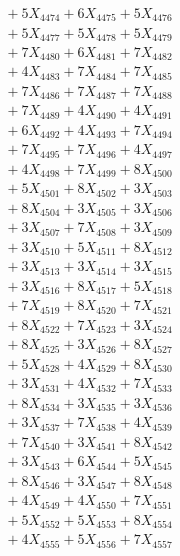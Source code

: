\documentclass[a4paper,10pt]{article}
\begin{document}
{\begin{align}
&\;  + 5 X_{4474} + 6 X_{4475} + 5 X_{4476} \\[0.3ex]
&\;  + 5 X_{4477} + 5 X_{4478} + 5 X_{4479} \\[0.5ex]\allowbreak
&\;  + 7 X_{4480} + 6 X_{4481} + 7 X_{4482} \\[0.3ex]
&\;  + 4 X_{4483} + 7 X_{4484} + 7 X_{4485} \\[0.3ex]
&\;  + 7 X_{4486} + 7 X_{4487} + 7 X_{4488} \\[0.3ex]
&\;  + 7 X_{4489} + 4 X_{4490} + 4 X_{4491} \\[0.3ex]
&\;  + 6 X_{4492} + 4 X_{4493} + 7 X_{4494} \\[0.3ex]
&\;  + 7 X_{4495} + 7 X_{4496} + 4 X_{4497} \\[0.3ex]
&\;  + 4 X_{4498} + 7 X_{4499} + 8 X_{4500} \\[0.3ex]
&\;  + 5 X_{4501} + 8 X_{4502} + 3 X_{4503} \\[0.3ex]
&\;  + 8 X_{4504} + 3 X_{4505} + 3 X_{4506} \\[0.3ex]
&\;  + 3 X_{4507} + 7 X_{4508} + 3 X_{4509} \\[0.5ex]\allowbreak
&\;  + 3 X_{4510} + 5 X_{4511} + 8 X_{4512} \\[0.3ex]
&\;  + 3 X_{4513} + 3 X_{4514} + 3 X_{4515} \\[0.3ex]
&\;  + 3 X_{4516} + 8 X_{4517} + 5 X_{4518} \\[0.3ex]
&\;  + 7 X_{4519} + 8 X_{4520} + 7 X_{4521} \\[0.3ex]
&\;  + 8 X_{4522} + 7 X_{4523} + 3 X_{4524} \\[0.3ex]
&\;  + 8 X_{4525} + 3 X_{4526} + 8 X_{4527} \\[0.3ex]
&\;  + 5 X_{4528} + 4 X_{4529} + 8 X_{4530} \\[0.3ex]
&\;  + 3 X_{4531} + 4 X_{4532} + 7 X_{4533} \\[0.3ex]
&\;  + 8 X_{4534} + 3 X_{4535} + 3 X_{4536} \\[0.3ex]
&\;  + 3 X_{4537} + 7 X_{4538} + 4 X_{4539} \\[0.5ex]\allowbreak
&\;  + 7 X_{4540} + 3 X_{4541} + 8 X_{4542} \\[0.3ex]
&\;  + 3 X_{4543} + 6 X_{4544} + 5 X_{4545} \\[0.3ex]
&\;  + 8 X_{4546} + 3 X_{4547} + 8 X_{4548} \\[0.3ex]
&\;  + 4 X_{4549} + 4 X_{4550} + 7 X_{4551} \\[0.3ex]
&\;  + 5 X_{4552} + 5 X_{4553} + 8 X_{4554} \\[0.3ex]
&\;  + 4 X_{4555} + 5 X_{4556} + 7 X_{4557} \\[0.3ex]

\end{align}}
\end{document}
